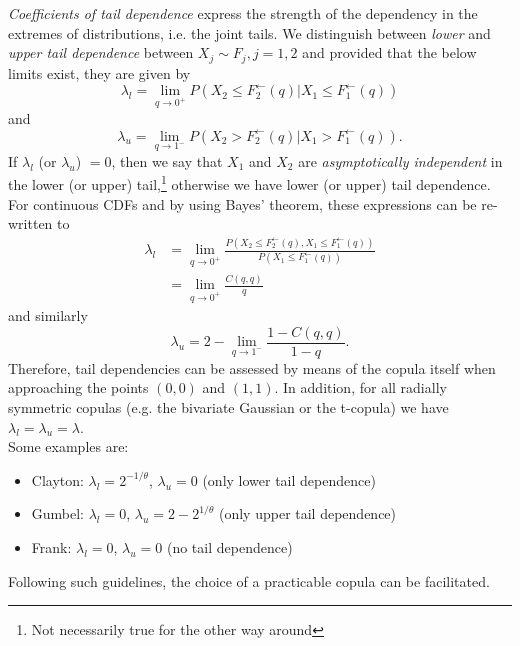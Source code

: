 
\textit{Coefficients of tail dependence} express the strength of the dependency in the extremes of distributions, i.e. the joint tails. We distinguish between \textit{lower} and \textit{upper tail dependence} between $X_j \sim F_j, j = 1,2$ and provided that the below limits exist, they are given by
\begin{equation}
\lambda_{l}=\lim \limits _ {q \rightarrow 0^+} P \left(X_{2} \leq F_{2}^{\leftarrow}(q) | X_{1} \leq F_{1}^{\leftarrow}(q)\right) 
\label{eq:lower_tail_dependence}
\end{equation}
and 
\begin{equation}
\lambda_{u}=\lim \limits _ {q \rightarrow 1^-} P \left(X_{2} > F_{2}^{\leftarrow}(q) | X_{1} > F_{1}^{\leftarrow}(q)\right).
\label{eq:upper_tail_dependence}
\end{equation}
If $\lambda_l$ (or $\lambda_u$) $=0$, then we say that $X_1$ and $X_2$ are \textit{asymptotically independent} in the lower (or upper) tail,\footnote{Not necessarily true for the other way around} otherwise we have lower (or upper) tail dependence.\\
For continuous \acp{CDF} and by using Bayes' theorem, these expressions can be re-written to
$$
\begin{aligned}
\lambda_{l} &=\lim _{q \rightarrow 0^+} \frac{P\left(X_{2} \leq F_{2}^{\leftarrow}(q), X_{1} \leq F_{1}^{\leftarrow}(q)\right)}{P\left(X_{1} \leq F_{1}^{\leftarrow}(q)\right)} \\
&=\lim _{q \rightarrow 0^+} \frac{C(q, q)}{q}
\end{aligned}
$$
and similarly
$$
\lambda_u = 2-\lim _{q \rightarrow 1^-} \frac{1-C(q, q)}{1-q}.
$$
Therefore, tail dependencies can be assessed by means of the copula itself when approaching the points $(0,0)$ and $(1,1)$. In addition, for all radially symmetric copulas (e.g. the bivariate Gaussian or the t-copula) we have $\lambda_l = \lambda_u = \lambda$.\\
Some examples are:
\begin{itemize}
\item Clayton: $\lambda_l = 2^{-1/ \theta}$, $\lambda_u = 0$ (only lower tail dependence)
\item Gumbel: $\lambda_l = 0$, $\lambda_u = 2 - 2^{1/ \theta}$ (only upper tail dependence)
\item Frank: $\lambda_l = 0$, $\lambda_u = 0$ (no tail dependence)
\end{itemize}
Following such guidelines, the choice of a practicable copula can be facilitated.




